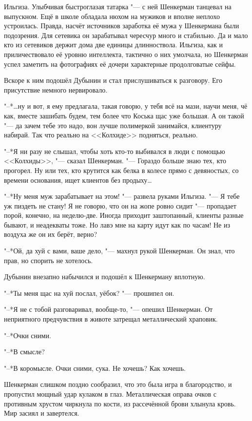 Ильгиза.
Улыбчивая быстроглазая татарка "--- с ней Шенкерман танцевал на выпускном.
Ещё в школе обладала нюхом на мужиков и вполне неплохо устроилась.
Правда, насчёт источников заработка её мужа у Шенкермана были подозрения.
Для сетевика он зарабатывал чересчур много и стабильно.
Да и мало кто из сетевиков держит дома две единицы длинноствола.
Ильгиза, как и приличествовало её уровню интеллекта, тактично о них умолчала, но Шенкерман успел заметить на фотографиях её дочери характерные продолговатые сейфы.

Вскоре к ним подошёл Дубынин и стал прислушиваться к разговору.
Его присутствие немного нервировало.

"--*\ldots{}ну и вот, я ему предлагала, такая говорю, у тебя всё на мази, научи меня, чё как, вместе зашибать будем, тем более что Коська щас уже большая.
А он такой "--- да зачем тебе это надо, вон лучше полимеркой занимайся, клиентуру набирай.
Так что реально на <<Колхиде>> подняться, реально.

"--*Я ни разу не слышал, чтобы хоть кто-то выбивался в люди с помощью <<Колхиды>>, "--- сказал Шенкерман.
"--- Гораздо больше знаю тех, кто прогорел.
Ну или тех, кто крутится как белка в колесе прямо с девяностых, со времени основания, ищет клиентов без продыху\ldots{}

"--*Ну меня муж зарабатывает на этом! "--- развела руками Ильгиза.
"--- Я тебе уж пиздеть не стану!
Я не говорю, что он на жопе ровно сидит "--- пропадает порой, конечно, на неделю-две.
Иногда приходит заштопанный, клиенты разные бывают, и неадекваты тоже.
Но лавэ мне на карту идут как по часам!
Не из воздуха же он их берёт, верно?

"--*Ой, да хуй с вами, ваше дело, "--- махнул рукой Шенкерман.
Он знал, что прав, но спорить не хотелось.

Дубынин внезапно набычился и подошёл к Шенкерману вплотную.

"--*Ты меня щас на хуй послал, уёбок? "--- прошипел он.

"--*Я не с тобой разговаривал, вообще-то, "--- опешил Шенкерман.
От неприятного предчувствия в животе затрещал металлический храповик.

"--*Очки сними.

"--*В смысле?

"--*В коромысле.
Очки сними, сука.
Не хочешь?
Как хочешь.

Шенкерман слишком поздно сообразил, что это была игра в благородство, и пропустил мощный удар кулаком в глаз.
Металлическая оправа очков с противным хрустом чиркнула по кости, из рассечённой брови хлынула кровь.
Мир засиял и завертелся.

